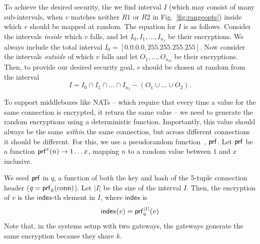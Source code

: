 To achieve the desired security, the we find interval $I$ (which may consist of many sub-intervals, \eg{} when $v$ matches neither $R1$ or $R2$ in Fig.~\ref{fig:rangeopts}) inside which $v$ should be mapped at random. The equation for $I$ is as follows. Consider the intervals {\em inside} which $v$ falls, and let $I_0, I_1, \dots, I_{n_I}$ be their encryptions. We always include the total interval $I_0 = [0.0.0.0, 255.255.255.255]$. Now consider the intervals {\em outside} of which $v$ falls and let $O_1, \dots, O_{n_O}$ be their encryptions. Then, to provide our desired security goal, $v$ should be chosen at random from the interval  
\begin{equation}
 I = I_0 \cap I_1 \cap ... \cap I_{n_I} - (O_1 \cup \dots \cup O_2). \label{eq:randominterval}
 \end{equation}

 

To support middleboxes like NATs -- which require that every time a value for the same connection is encrypted, it return the same value -- we need to generate the random encryptions using a deterministic function. Importantly, this value should always be the same {\it within} the same connection, but across different connections it should be different. For this, we use a pseudorandom function~\cite{GoldreichVol1}, $\mathsf{prf}$. Let $\mathsf{prf}$ be a function $\mathsf{prf}^{x}(n) \rightarrow {1 \ldots x}$, mapping $n$ to a random value between $1$ and $x$ inclusive. 

We seed $\mathsf{prf}$  in $q$, a function of both the key and hash of the 5-tuple connection header ($q = \mathsf{prf}_k(\text{conn})$).  Let $|I|$ be the size of the interval $I$. 
Then, the encryption of $v$ is the $\mathsf{index}$-th element in $I$, where $\mathsf{index}$ is 
\begin{equation}
\mathsf{index}(v) = \mathsf{prf}_{q}^{|I|}(v) 
\end{equation}
  Note that, in the systems setup with two gateways, the gateways generate the same encryption because they share $k$. 

